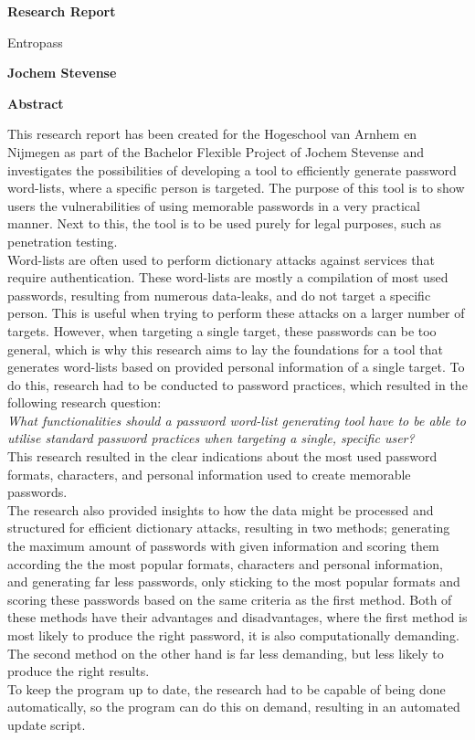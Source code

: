 \documentclass[a4paper,12pt]{article}
\begin{document}
\thispagestyle{plain}
\begin{center}
    \Large
    \textbf{Research Report}
        
    \vspace{0.4cm}
    \large
    Entropass
        
    \vspace{0.4cm}
    \textbf{Jochem Stevense}
       
    \vspace{0.9cm}
    \textbf{Abstract}
\end{center}

This research report has been created for the Hogeschool van Arnhem en Nijmegen as part of the Bachelor Flexible Project of Jochem Stevense and investigates the possibilities of developing a tool to efficiently generate password word-lists, where a specific person is targeted. The purpose of this tool is to show users the vulnerabilities of using memorable passwords in a very practical manner. Next to this, the tool is to be used purely for legal purposes, such as penetration testing.\\

Word-lists are often used to perform dictionary attacks against services that require authentication. These word-lists are mostly a compilation of most used passwords, resulting from numerous data-leaks, and do not target a specific person. This is useful when trying to perform these attacks on a larger number of targets. However, when targeting a single target, these passwords can be too general, which is why this research aims to lay the foundations for a tool that generates word-lists based on provided personal information of a single target. To do this, research had to be conducted to password practices, which resulted in the following research question:\\
\textit{What functionalities should a password word-list generating tool have to be able to utilise standard password practices when targeting a single, specific user?}\\
This research resulted in the clear indications about the most used password formats, characters, and personal information used to create memorable passwords.\\
The research also provided insights to how the data might be processed and structured for efficient dictionary attacks, resulting in two methods; generating the maximum amount of passwords with given information and scoring them according the the most popular formats, characters and personal information, and generating far less passwords, only sticking to the most popular formats and scoring these passwords based on the same criteria as the first method. Both of these methods have their advantages and disadvantages, where the first method is most likely to produce the right password, it is also computationally demanding. The second method on the other hand is far less demanding, but less likely to produce the right results.\\
To keep the program up to date, the research had to be capable of being done automatically, so the program can do this on demand, resulting in an automated update script.\\
\end{document}
